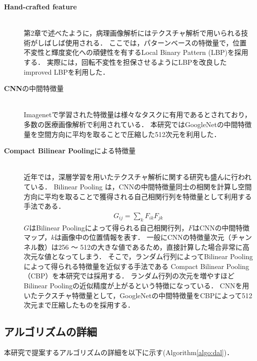 \begin{description}
    \item[\textbf{Hand-crafted feature}]\mbox{}\\
        第2章で述べたように，病理画像解析にはテクスチャ解析で用いられる技術がしばしば使用される．
        ここでは，パターンベースの特徴量で，位置不変性と輝度変化への頑健性を有するLocal Binary Pattern (LBP)\cite{ojala2002multiresolution}を採用する．
        実際には，回転不変性を担保させるようにLBPを改良したimproved LBPを利用した．
    \item[\textbf{CNN}の中間特徴量]\mbox{}\\
        Imagenetで学習された特徴量は様々なタスクに有用であるとされており，多数の医療画像解析で利用されている．
        本研究ではGoogleNet\cite{szegedy2015going}の中間特徴量を空間方向に平均を取ることで圧縮した512次元を利用した．
    \item[\textbf{Compact Bilinear Pooling}による特徴量]\mbox{}\\ 
        近年では，深層学習を用いたテクスチャ解析に関する研究も盛んに行われている．
        Bilinear Pooling \cite{lin2015bilinear}は，CNNの中間特徴量同士の相関を計算し空間方向に平均を取ることで獲得される自己相関行列を特徴量として利用する手法である．
        \begin{eqnarray}
        G_{ij} = \sum_k{F_{ik} F_{jk}}
        \end{eqnarray}
        $G$はBilinear Poolingによって得られる自己相関行列，$F$はCNNの中間特徴マップ，$k$は画像中の位置情報を表す．
        一般にCNNの特徴量次元（チャンネル数）は256 〜 512の大きな値であるため，直接計算した場合非常に高次元な値となってしまう．
        そこで，ランダム行列によってBilinear Poolingによって得られる特徴量を近似する手法である
        Compact Bilinear Pooling（CBP）\cite{gao2016compact}を本研究では採用する．
        ランダム行列の次元を増やすほどBilinear Poolingの近似精度が上がるという特徴になっている．
        CNNを用いたテクスチャ特徴量として，GoogleNet\cite{szegedy2015going}の中間特徴量をCBPによって512次元まで圧縮したものを採用する．
\end{description}

\subsection{アルゴリズムの詳細}

本研究で提案するアルゴリズムの詳細を以下に示す(Algorithm\ref{algo:dal})．

